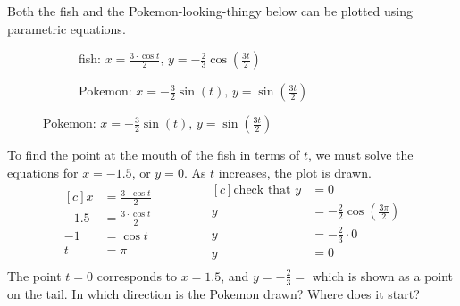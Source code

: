 Both the fish and the Pokemon-looking-thingy below can be plotted using parametric equations.
\begin{figure}[H]
	\begin{subfigure}[b]{0.5\textwidth}
		\centering
		  \caption{fish: $\displaystyle x=\frac{3\cdot\cos t}{2},\, y=-\frac{2}{3}\cos\left(\frac{3t}{2}\right)$}
	\end{subfigure}
	\begin{subfigure}[b]{0.5\textwidth}
		\centering
		  \caption{Pokemon: $\displaystyle x=-\frac{3}{2}\sin(t),\,y=\sin\left(\frac{3t}{2}\right)$}
	\end{subfigure}
\end{figure}
To find the point at the mouth of the fish in terms of $t$, we must solve the equations for $x=-1.5$, or $y=0$. As $t$ increases, the plot is drawn.
\begin{equation*}
	\begin{aligned}[c]
x&=\frac{3\cdot\cos t}{2}\\
-1.5&=\frac{3\cdot\cos t}{2}\\
-1&=\cos t \\
t&=\pi\\
	\end{aligned}\qquad\qquad
	\begin{aligned}[c]
	 \text{check that }y&=0\\
	 y&=-\frac{2}{2}\cos\left(\frac{3\pi}{2}\right)\\
	y&=-\frac{2}{3}\cdot 0\\
	y&=0\\
	\end{aligned}
\end{equation*}
The point $t=0$ corresponds to $x=1.5$, and $y=-\frac{2}{3}=$ which is shown as a point on the tail.
\exercise In which direction is the Pokemon drawn? Where does it start?\\
